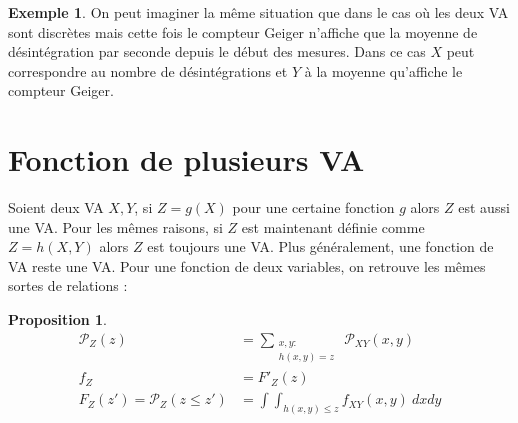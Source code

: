 \documentclass[a4paper,12pt]{report}
\theoremstyle{definition}
\renewcommand{\(}{\left(}
\renewcommand{\)}{\right)}
\renewcommand{\P}{\mathcal{P}}
\newtheorem{exmp}[thm]{Exemple}
\newtheorem{prop}[thm]{Proposition}
\begin{document}
            \begin{exmp}
                On peut imaginer la même situation que dans le cas où les deux VA sont discrètes mais cette fois le compteur Geiger n'affiche que la moyenne de désintégration par seconde depuis le début des mesures. Dans ce cas $X$ peut correspondre au nombre de désintégrations et $Y$ à la moyenne qu'affiche le compteur Geiger.
            \end{exmp}
        
        \section{Fonction de plusieurs VA}
        
            Soient deux VA $X,Y$, si $Z = g(X)$ pour une certaine fonction $g$ alors $Z$ est aussi une VA. Pour les mêmes raisons, si $Z$ est maintenant définie comme $Z=h(X,Y)$ alors $Z$ est toujours une VA. Plus généralement, une fonction de VA reste une VA. Pour une fonction de deux variables, on retrouve les mêmes sortes de relations :
            
            \begin{leftbar}
            \begin{prop}
                \begin{align*}
                    \P_Z(z) &= \sum_{\substack{x,y :\\h(x,y)=z}}~\P_{XY}(x,y)\\
                    f_Z &= F'_Z(z) \\
                    F_Z(z') = \P_Z(z\leq z') &= \int\int_{h(x,y)\leq z} f_{XY}(x,y)~dxdy
                \end{align*}
            \end{prop}
            \end{leftbar}
        
\end{document}
